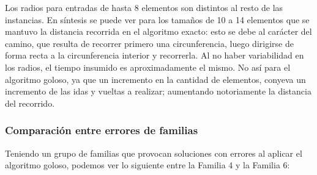  
\vspace*{0.3cm} \vspace*{0.3cm}
\begin{figure} [!ht]
 \centering
    \end{figure}

 
Los radios para entradas de hasta 8 elementos son distintos al resto de las instancias. En síntesis se puede ver para los tamaños de 10 a 14 elementos que se mantuvo la distancia recorrida en el algoritmo exacto: esto se debe al carácter del camino, que resulta de recorrer primero una circunferencia, luego dirigirse de forma recta a la circunferencia interior y recorrerla. Al no haber variabilidad en los radios, el tiempo insumido es aproximadamente el mismo. No así para el algoritmo goloso, ya que un incremento en la cantidad de elementos, conyeva un incremento de las idas y vueltas a realizar; aumentando notoriamente la distancia del recorrido.


\subsubsection*{Comparación entre errores de familias}

Teniendo un grupo de familias que provocan soluciones con errores al aplicar el algoritmo goloso, podemos ver lo siguiente entre la Familia 4 y la Familia 6:

